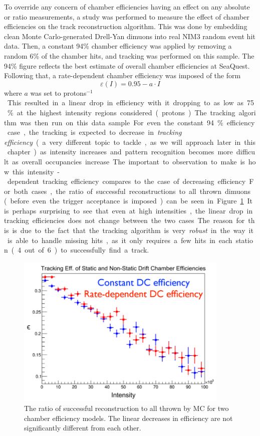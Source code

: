 To override any concern of chamber efficiencies having an effect on any absolute or ratio measurements, a study was performed to measure the effect of chamber efficiencies on the track reconstruction algorithm. This was done by embedding clean Monte Carlo-generated Drell-Yan dimuons into real NIM3 random event hit data. Then, a constant 94\% chamber efficiency was applied by removing a random 6\% of the chamber hits, and tracking was performed on this sample. The 94\% figure reflects the best estimate of overall chamber efficiencies at SeaQuest. Following that, a rate-dependent chamber efficiency was imposed of the form
\begin{equation}
\varepsilon(I) = 0.95 - a \cdot I
\end{equation}
where $a$ was set to \unit[2e-6]{protons$^{-1}$}. This resulted in a linear drop in efficiency with it dropping to as low as 75\% at the highest intensity regions considered (\unit[100000]{protons}). The tracking algorithm was then run on this data sample.
	
For even the constant 94\% efficiency case, the tracking is expected to decrease in \emph{tracking efficiency} (a very different topic to tackle, as we will approach later in this chapter) as intensity increases and pattern recognition becomes more difficult as overall occupancies increase. The important to observation to make is how this intensity-dependent tracking efficiency compares to the case of decreasing efficiency. For both cases, the ratio of successful reconstructions to all thrown dimuons (before even the trigger acceptance is imposed) can be seen in Figure~\ref{fig:ktrack-eff-int}. It is perhaps surprising to see that even at high intensities, the linear drop in tracking efficiencies does not change between the two cases. The reason for this is due to the fact that the tracking algorithm is very \emph{robust} in the way it is able to handle missing hits, as it only requires a few hits in each station (4 out of 6) to successfully find a track.
\begin{figure}
	\centering
	\includegraphics[width=4in]{figures/analysis/ktrack-eff-int.png}
	\caption{The ratio of successful reconstruction to all thrown by MC for two chamber efficiency models. The linear decreases in efficiency are not significantly different from each other.}
	\label{fig:ktrack-eff-int}
\end{figure}

